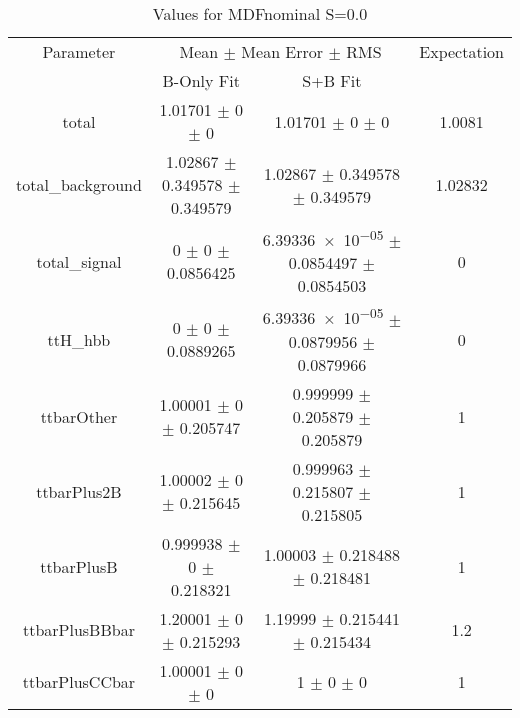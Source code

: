 \begin{table}
\centering
\caption{Values for MDFnominal S=0.0}
\begin{tabular}{cccc}
\toprule
Parameter & \multicolumn{2}{c}{Mean $\pm$ Mean Error $\pm$ RMS} & Expectation\\
 & B-Only Fit & S+B Fit & \\
\midrule
total & \num{1.01701} $\pm$ \num{0} $\pm$ \num{0} & \num{1.01701} $\pm$ \num{0} $\pm$ \num{0} & \num{1.0081}\\
total\_background & \num{1.02867} $\pm$ \num{0.349578} $\pm$ \num{0.349579} & \num{1.02867} $\pm$ \num{0.349578} $\pm$ \num{0.349579} & \num{1.02832}\\
total\_signal & \num{0} $\pm$ \num{0} $\pm$ \num{0.0856425} & \num{6.39336e-05} $\pm$ \num{0.0854497} $\pm$ \num{0.0854503} & \num{0}\\
ttH\_hbb & \num{0} $\pm$ \num{0} $\pm$ \num{0.0889265} & \num{6.39336e-05} $\pm$ \num{0.0879956} $\pm$ \num{0.0879966} & \num{0}\\
ttbarOther & \num{1.00001} $\pm$ \num{0} $\pm$ \num{0.205747} & \num{0.999999} $\pm$ \num{0.205879} $\pm$ \num{0.205879} & \num{1}\\
ttbarPlus2B & \num{1.00002} $\pm$ \num{0} $\pm$ \num{0.215645} & \num{0.999963} $\pm$ \num{0.215807} $\pm$ \num{0.215805} & \num{1}\\
ttbarPlusB & \num{0.999938} $\pm$ \num{0} $\pm$ \num{0.218321} & \num{1.00003} $\pm$ \num{0.218488} $\pm$ \num{0.218481} & \num{1}\\
ttbarPlusBBbar & \num{1.20001} $\pm$ \num{0} $\pm$ \num{0.215293} & \num{1.19999} $\pm$ \num{0.215441} $\pm$ \num{0.215434} & \num{1.2}\\
ttbarPlusCCbar & \num{1.00001} $\pm$ \num{0} $\pm$ \num{0} & \num{1} $\pm$ \num{0} $\pm$ \num{0} & \num{1}\\
\bottomrule
\end{tabular}
\end{table}